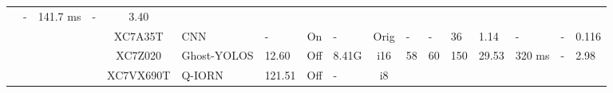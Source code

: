 \begin{table}
\begin{adjustbox}{totalheight=\baselineskip,}
\begin{tabular}{ccccclp{2em}cp{3em}cp{2em}p{4em}p{3em}p{3.5em}p{3.5em}p{2.5em}p{3em}}
                                                   &\multirow{1}{*}{-}
                                                       &\multirow{1}{*}{141.7 ms}
                                                           &\multirow{1}{*}{-}
                                                               &\multirow{1}{*}{3.40}\\
\cmidrule{4-17}
   &   &   &\multirow{1}{*}{\cite{vitoloRealTimeOnboardSatellite2024}}
               &\multirow{1}{*}{XC7A35T}
                   &\multirow{1}{*}{CNN}
                       &\multirow{1}{*}{-}
                           &\multirow{1}{*}{On}
                               &\multirow{1}{*}{-}
                                   &\multirow{1}{*}{Orig}
                                       &\multirow{1}{*}{-}
                                           &\multirow{1}{*}{-}
                                               &\multirow{1}{*}{36}
                                                   &\multirow{1}{*}{1.14}
                                                       &\multirow{1}{*}{-}
                                                           &\multirow{1}{*}{-}
                                                               &\multirow{1}{*}{0.116}\\
\cmidrule{4-17}
   &   &   &\multirow{1}{*}{\cite{yangLightweightDetectionMethod2023}}
               &\multirow{1}{*}{XC7Z020}
                   &\multirow{1}{*}{Ghost-YOLOS}
                       &\multirow{1}{*}{12.60}
                           &\multirow{1}{*}{Off}
                               &\multirow{1}{*}{8.41G}
                                   &\multirow{1}{*}{i16}
                                       &\multirow{1}{*}{58}
                                           &\multirow{1}{*}{60}
                                               &\multirow{1}{*}{150}
                                                   &\multirow{1}{*}{29.53}
                                                       &\multirow{1}{*}{320 ms}
                                                           &\multirow{1}{*}{-}
                                                               &\multirow{1}{*}{2.98}\\
\cmidrule{4-17}
   &   &   &\multirow{1}{*}{\cite{zhangEfficientFPGABasedImplementation2020}}
               &\multirow{1}{*}{XC7VX690T}
                   &\multirow{1}{*}{Q-IORN}
                       &\multirow{1}{*}{121.51}
                           &\multirow{1}{*}{Off}
                               &\multirow{1}{*}{-}
                                   &\multirow{1}{*}{i8}

\end{tabular}
\end{adjustbox}
\end{table}
